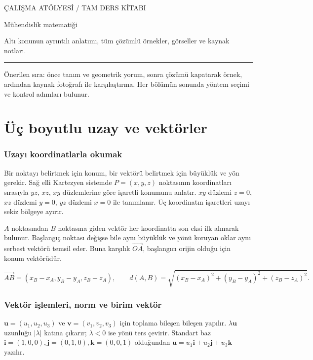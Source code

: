 
{\sffamily\small\color{accent} ÇALIŞMA ATÖLYESİ / TAM DERS KİTABI\par}
\vspace{8mm}
{\Huge\sffamily\bfseries\raggedright{} Mühendislik matematiği\par}
\vspace{3mm}
{\large Altı konunun ayrıntılı anlatımı, tüm çözümlü örnekler, görseller ve kaynak notları.\par}
\vspace{4mm}\hrule\vspace{4mm}Önerilen sıra: önce tanım ve geometrik yorum, sonra çözümü kapatarak örnek, ardından kaynak fotoğrafı ile karşılaştırma. Her bölümün sonunda yöntem seçimi ve kontrol adımları bulunur.
\tableofcontents\clearpage
\clearpage\part{Üç boyutlu uzay ve vektörler}
\section{Uzayı koordinatlarla okumak}
Bir noktayı belirtmek için konum, bir vektörü belirtmek için büyüklük ve yön gerekir. Sağ elli Kartezyen sistemde \(P=(x,y,z)\) noktasının koordinatları sırasıyla \(yz\), \(xz\), \(xy\) düzlemlerine göre işaretli konumunu anlatır. \(xy\) düzlemi \(z=0\), \(xz\) düzlemi \(y=0\), \(yz\) düzlemi \(x=0\) ile tanımlanır. Üç koordinatın işaretleri uzayı sekiz bölgeye ayırır.

\(A\) noktasından \(B\) noktasına giden vektör her koordinatta son eksi ilk alınarak bulunur. Başlangıç noktası değişse bile aynı büyüklük ve yönü koruyan oklar aynı serbest vektörü temsil eder. Buna karşılık \(\overrightarrow{OA}\), başlangıcı orijin olduğu için konum vektörüdür.


{\small\[
\overrightarrow{AB}=(x_B-x_A,y_B-y_A,z_B-z_A),\qquad d(A,B)=\sqrt{(x_B-x_A)^2+(y_B-y_A)^2+(z_B-z_A)^2}.
\]}
\section{Vektör işlemleri, norm ve birim vektör}
\(\mathbf u=(u_1,u_2,u_3)\) ve \(\mathbf v=(v_1,v_2,v_3)\) için toplama bileşen bileşen yapılır. \(\lambda\mathbf u\) uzunluğu \(|\lambda|\) katına çıkarır; \(\lambda<0\) ise yönü ters çevirir. Standart baz \(\mathbf i=(1,0,0),\mathbf j=(0,1,0),\mathbf k=(0,0,1)\) olduğundan \(\mathbf u=u_1\mathbf i+u_2\mathbf j+u_3\mathbf k\) yazılır.


